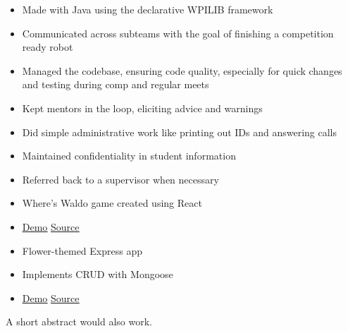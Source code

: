 \documentclass[10pt,a4paper,ragged2e,withhyper]{altacv}
\begin{document}
\begin{paracol}{2}

\begin{itemize}
\item Made with Java using the declarative WPILIB framework
\item Communicated across subteams with the goal of finishing a competition ready robot
\item Managed the codebase, ensuring code quality, especially for quick changes and testing during comp and regular meets
\item Kept mentors in the loop, eliciting advice and warnings
\end{itemize}

\divider

\begin{itemize}
\item Did simple administrative work like printing out IDs and answering calls
\item Maintained confidentiality in student information
\item Referred back to a supervisor when necessary
\end{itemize}


\begin{itemize}
\item Where's Waldo game created using React
\item \href{https://joel-singh.github.io/waldo}{\underline{Demo}} \href{https://github.com/Joel-Singh/waldo}{\underline{Source}}
\end{itemize}
\divider

\begin{itemize}
\item Flower-themed Express app
\item Implements CRUD with Mongoose
\item \href{joel-singh.com}{\underline{Demo}} \href{joel-singh.com}{\underline{Source}}
\end{itemize}
\divider

A short abstract would also work.


\end{paracol}
\end{document}
